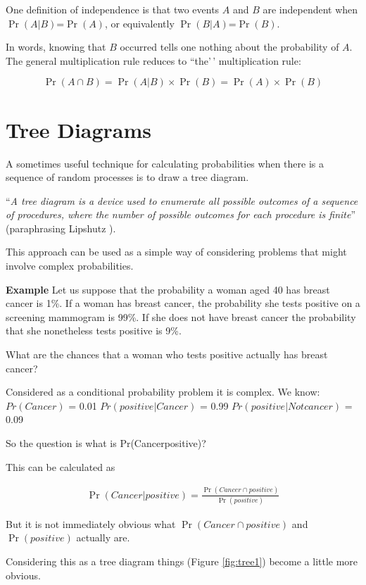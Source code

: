 \documentclass[
  oneside]{krantz}
\begin{document}
One definition of independence is that two events \(A\) and \(B\) are independent when \(\Pr(A|B)\)=\(\Pr(A)\), or equivalently \(\Pr(B|A)\)=\(\Pr(B)\).

In words, knowing that \(B\) occurred tells one nothing about the probability of \(A\). The general multiplication rule reduces to ``the'\,' multiplication rule:

\[
    \Pr(A \cap B)  =  \Pr(A|B) \times \Pr(B) = \Pr(A) \times \Pr(B) 
\]

\hypertarget{tree-diagrams}{%
\section{Tree Diagrams}\label{tree-diagrams}}

A sometimes useful technique for calculating probabilities when there is a sequence
of random processes is to draw a tree diagram.

``\emph{A tree diagram is a device used to enumerate all possible outcomes of a sequence of procedures, where the number of possible outcomes for each procedure is finite}''
(paraphrasing Lipshutz \citeyearpar{Lipshutz2011}).

This approach can be used as a simple way of considering problems that might involve complex probabilities.

\textbf{Example} Let us suppose that the probability a woman aged 40 has breast cancer is 1\%. If a woman has breast cancer, the probability she tests positive on a screening mammogram is 99\%. If she does not have breast cancer the probability that she nonetheless tests positive is 9\%.

What are the chances that a woman who tests positive actually has breast cancer?

Considered as a conditional probability problem it is complex.
We know:
\(Pr(Cancer)\) = 0.01
\(Pr(positive|Cancer)\) = 0.99
\(Pr(positive|Not cancer)\) = 0.09

So the question is what is Pr(Cancer\textbar positive)?

This can be calculated as

\begin{eqnarray*}
 \Pr(Cancer|positive)  =  \frac{\Pr(Cancer \cap positive)}{\Pr(positive)}
\end{eqnarray*}

But it is not immediately obvious what \(\Pr(Cancer \cap positive)\) and \(\Pr(positive)\) actually are.

Considering this as a tree diagram things (Figure \ref{fig:tree1}) become a little more obvious.
\end{document}
